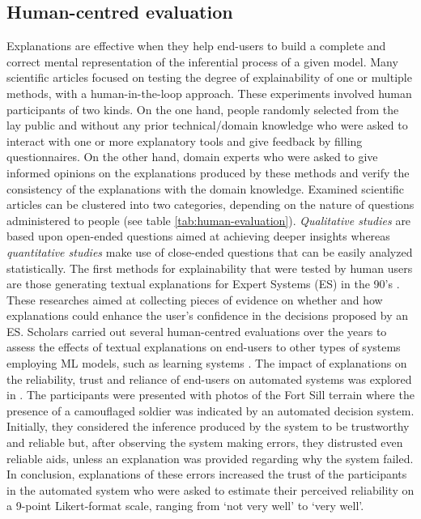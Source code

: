 \documentclass[final,1p,times]{elsarticle}
\begin{document}
\subsection{Human-centred evaluation}\label{humansurvey}
Explanations are effective when they help end-users to build a complete and correct mental representation of the inferential process of a given model. Many scientific articles focused on testing the degree of explainability of one or multiple methods, with a human-in-the-loop approach. These experiments involved human participants of two kinds. On the one hand, people randomly selected from the lay public and without any prior technical/domain knowledge who were asked to interact with one or more explanatory tools and give feedback by filling questionnaires. On the other hand, domain experts who were asked to give informed opinions on the explanations produced by these methods and verify the consistency of the explanations with the domain knowledge.
Examined scientific articles can be clustered into two categories, depending on the nature of questions administered to people (see table \ref{tab:human-evaluation}).
\textit{Qualitative studies} are based upon open-ended questions aimed at achieving deeper insights whereas \textit{quantitative studies} make use of close-ended questions that can be easily analyzed statistically.
The first methods for explainability that were tested by human users are those generating textual explanations for Expert Systems (ES) in the 90's \cite{suermondt1993evaluation, ye1995impact}. These researches aimed at collecting pieces of evidence on whether and how explanations could enhance the user's confidence in the decisions proposed by an ES. Scholars carried out several human-centred evaluations over the years to assess the effects of textual explanations on end-users to other types of systems employing ML models, such as learning systems \cite{aleven2002effective}.
The impact of explanations on the reliability, trust and reliance of end-users on automated systems was explored in \cite{dzindolet2003role}. The participants were presented with photos of the Fort Sill terrain where the presence of a camouflaged soldier was indicated by an automated decision system. Initially, they considered the inference produced by the system to be trustworthy and reliable but, after observing the system making errors, they distrusted even reliable aids, unless an explanation was provided regarding why the system failed. In conclusion, explanations of these errors increased the trust of the participants in the automated system who were asked to estimate their perceived reliability on a 9-point Likert-format scale, ranging from `not very well' to `very well'.
\end{document}
